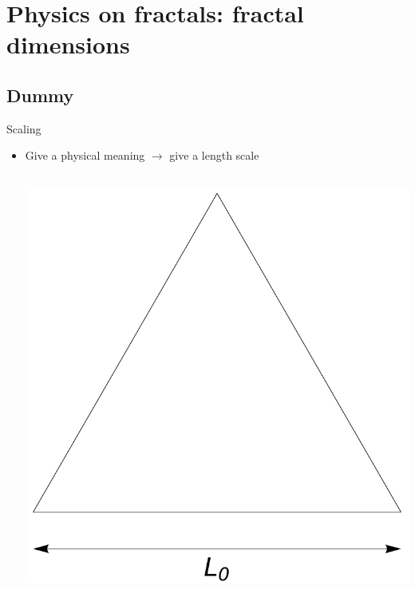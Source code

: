 \documentclass[xcolor=x11names,compress,professionalfonts]{beamer}
\renewcommand{\(}{\begin{columns}}
\renewcommand{\)}{\end{columns}}
\newcommand{\<}[1]{\begin{column}{#1}}
\renewcommand{\>}{\end{column}}
\begin{document}
\section{Physics on fractals: fractal dimensions}
\subsection{Dummy}
\begin{frame}{Scaling}

\begin{itemize}
	\item Give a physical meaning $\rightarrow$ give a length scale

\begin{columns}
\newcommand{\s}{.2}
  \begin{column}{3cm}
  \centering
    \includegraphics[scale=\s]{scale0.pdf}
  \end{column}


\end{columns}
\end{itemize}
\end{frame}
\end{document}
